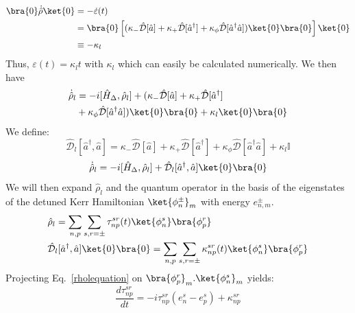 \begin{equation}
    \begin{split}
        \bra{0}\dot{\hat \rho}\ket{0} &= -\dot{\varepsilon}(t) \\
         &= \bra{0} \left[ ( \kappa_- \mathcal{\hat D}[\hat a] + \kappa_+ \mathcal{\hat D}[\hat a^\dagger] + \kappa_\phi \mathcal{\hat D}[\hat a^\dagger \hat a] )\ket{0}\bra{0} \right]\ket{0} \\
        &\equiv -\kappa_l
    \end{split}
\end{equation}
Thus, $\varepsilon(t) = \kappa_l t$ with $\kappa_l$ which can easily be calculated numerically. We then have 
\begin{equation}
    \begin{split}
        \dot{\hat{\rho}}_l &= -i[\hat H_\Delta,\hat \rho_l] + (\kappa_- \mathcal{\hat D}[\hat a] + \kappa_+ \mathcal{\hat D}[\hat a^\dagger] \\
         &+ \kappa_\phi \mathcal{\hat D}[\hat a^\dagger \hat a])\ket{0}\bra{0} + \kappa_l \ket{0}\bra{0}
    \end{split}
\end{equation}
We define:
\begin{equation}
    \mathcal{\hat D}_l[\hat a^\dagger,\hat a] = \kappa_- \mathcal{\hat D}[\hat a] + \kappa_+ \mathcal{\hat D}[\hat a^\dagger] + \kappa_\phi \mathcal{\hat D}[\hat a^\dagger \hat a] + \kappa_l \mathbb{I}
\end{equation}
\begin{equation}
    \dot{\hat \rho}_l = -i[\hat H_\Delta,\hat \rho_l] + \mathcal{\hat D}_l[\hat a^\dagger,\hat a] \ket{0}\bra{0}
    \label{rholequation}
\end{equation}
We will then expand $\hat \rho_l$ and the quantum operator in the basis of the eigenstates of the detuned Kerr Hamiltonian $\ket{{\phi}_n^\pm}_m$ with energy $e^\pm_{n,m}$.
\begin{equation}
    \begin{split}
        &\hat \rho_l = \displaystyle\sum_{n,p} \sum_{s,r=\pm} \tau_{np}^{sr}(t) \ket{{\phi}_n^s} \bra{{\phi}_p^r} \\
        &\mathcal{\hat D}_l[\hat a^\dagger,\hat a] \ket{0}\bra{0} = \displaystyle\sum_{n,p} \sum_{s,r=\pm} \kappa_{np}^{sr}(t) \ket{{\phi}_n^s} \bra{{\phi}_p^r}
    \end{split}
\end{equation}
Projecting Eq.~\eqref{rholequation} on $ \bra{{\phi}_p^r}_m . \ket{{\phi}_n^s}_m$ yields:
\begin{equation}
    \frac{d \tau_{np}^{sr}}{dt} = -i\tau_{np}^{sr}(e^s_n- e^s_p) + \kappa_{np}^{sr}
    \label{tau}
\end{equation}


